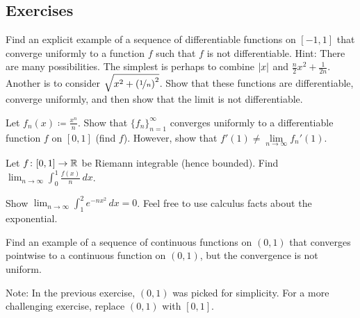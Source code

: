 \subsection{Exercises}

\begin{exercise}
Find an explicit example of a sequence of
differentiable functions on $[-1,1]$ that converge uniformly to
a function $f$ such that $f$ is not differentiable.
Hint:
There are many possibilities.
The simplest is perhaps to combine $\lvert {x} \rvert$ and $\frac{n}{2}x^2 +
\frac{1}{2n}$.
Another is to
consider $\sqrt{x^2+{(\nicefrac{1}{n})}^2}$.  Show that these functions are differentiable,
converge uniformly, and then show that the limit is not differentiable.
\end{exercise}

\begin{exercise}
Let $f_n(x) \coloneqq \frac{x^n}{n}$.  Show that $\{ f_n \}_{n=1}^\infty$ converges uniformly to
a differentiable function $f$ on $[0,1]$ (find $f$).  However, show that
$f'(1) \neq \lim\limits_{n\to\infty} f_n'(1)$.
\end{exercise}

%
\begin{exercise}
Let $f \colon [0,1] \to {\mathbb{R}}$ be Riemann integrable (hence bounded).
Find $\displaystyle \lim_{n\to\infty} \int_0^1 \frac{f(x)}{n} \,dx$.
\end{exercise}

\begin{exercise}
Show
$\displaystyle \lim_{n\to\infty} \int_1^2 e^{-nx^2} \,dx = 0$.  Feel free to
use calculus facts about the exponential.
\end{exercise}

\begin{exercise}
Find an example of a sequence of continuous functions on $(0,1)$ that converges 
pointwise to a continuous function on $(0,1)$, but the convergence is not
uniform.
\end{exercise}

\begin{exnote}
Note: In the previous exercise, $(0,1)$ was picked for simplicity.  For a
more challenging exercise, replace $(0,1)$ with $[0,1]$.
\end{exnote}

